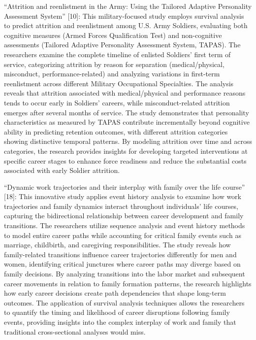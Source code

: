 \documentclass[./main.tex]{subfiles}
\begin{document}
``Attrition and reenlistment in the Army: Using the Tailored Adaptive
Personality Assessment System'' {[}10{]}: This military-focused study
employs survival analysis to predict attrition and reenlistment among
U.S. Army Soldiers, evaluating both cognitive measures (Armed Forces
Qualification Test) and non-cognitive assessments (Tailored Adaptive
Personality Assessment System, TAPAS). The researchers examine the
complete timeline of enlisted Soldiers' first term of service,
categorizing attrition by reason for separation (medical/physical,
misconduct, performance-related) and analyzing variations in first-term
reenlistment across different Military Occupational Specialties. The
analysis reveals that attrition associated with medical/physical and
performance reasons tends to occur early in Soldiers' careers, while
misconduct-related attrition emerges after several months of service.
The study demonstrates that personality characteristics as measured by
TAPAS contribute incrementally beyond cognitive ability in predicting
retention outcomes, with different attrition categories showing
distinctive temporal patterns. By modeling attrition over time and
across categories, the research provides insights for developing
targeted interventions at specific career stages to enhance force
readiness and reduce the substantial costs associated with early Soldier
attrition.

``Dynamic work trajectories and their interplay with family over the
life course'' {[}18{]}: This innovative study applies event history
analysis to examine how work trajectories and family dynamics interact
throughout individuals' life courses, capturing the bidirectional
relationship between career development and family transitions. The
researchers utilize sequence analysis and event history methods to model
entire career paths while accounting for critical family events such as
marriage, childbirth, and caregiving responsibilities. The study reveals
how family-related transitions influence career trajectories differently
for men and women, identifying critical junctures where career paths may
diverge based on family decisions. By analyzing transitions into the
labor market and subsequent career movements in relation to family
formation patterns, the research highlights how early career decisions
create path dependencies that shape long-term outcomes. The application
of survival analysis techniques allows the researchers to quantify the
timing and likelihood of career disruptions following family events,
providing insights into the complex interplay of work and family that
traditional cross-sectional analyses would miss.
\end{document}
